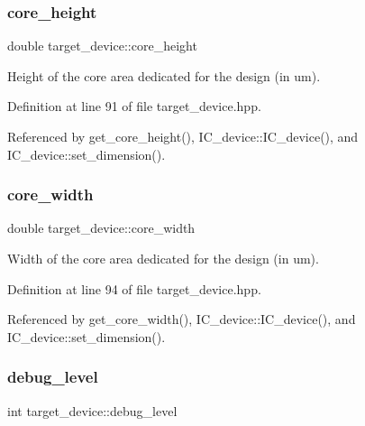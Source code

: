 \subsubsection{\texorpdfstring{core\+\_\+height}{core\_height}}
{\footnotesize\ttfamily double target\+\_\+device\+::core\+\_\+height\hspace{0.3cm}{\ttfamily [protected]}}



Height of the core area dedicated for the design (in um). 



Definition at line 91 of file target\+\_\+device.\+hpp.



Referenced by get\+\_\+core\+\_\+height(), I\+C\+\_\+device\+::\+I\+C\+\_\+device(), and I\+C\+\_\+device\+::set\+\_\+dimension().

\mbox{\label{classtarget__device_ae0180645e44114a173d1f6362a4c6426}} 
\subsubsection{\texorpdfstring{core\+\_\+width}{core\_width}}
{\footnotesize\ttfamily double target\+\_\+device\+::core\+\_\+width\hspace{0.3cm}{\ttfamily [protected]}}



Width of the core area dedicated for the design (in um). 



Definition at line 94 of file target\+\_\+device.\+hpp.



Referenced by get\+\_\+core\+\_\+width(), I\+C\+\_\+device\+::\+I\+C\+\_\+device(), and I\+C\+\_\+device\+::set\+\_\+dimension().

\mbox{\label{classtarget__device_a8b6c191a28f28f9f681a6b0fe2e8d1e1}} 
\subsubsection{\texorpdfstring{debug\+\_\+level}{debug\_level}}
{\footnotesize\ttfamily int target\+\_\+device\+::debug\+\_\+level\hspace{0.3cm}{\ttfamily [protected]}}



